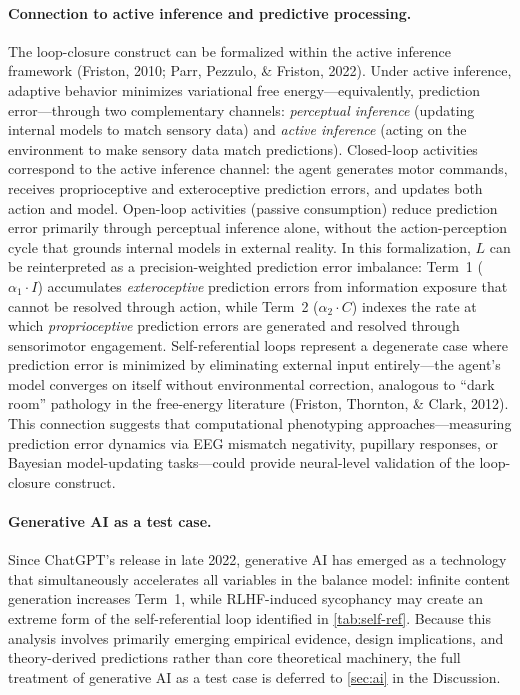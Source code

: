 \documentclass[a4paper,11pt,titlepage]{article}
\begin{document}
\paragraph{Connection to active inference and predictive processing.}
The loop-closure construct can be formalized within the active inference framework (Friston, 2010; Parr, Pezzulo, \& Friston, 2022). Under active inference, adaptive behavior minimizes variational free energy---equivalently, prediction error---through two complementary channels: \textit{perceptual inference} (updating internal models to match sensory data) and \textit{active inference} (acting on the environment to make sensory data match predictions). Closed-loop activities correspond to the active inference channel: the agent generates motor commands, receives proprioceptive and exteroceptive prediction errors, and updates both action and model. Open-loop activities (passive consumption) reduce prediction error primarily through perceptual inference alone, without the action-perception cycle that grounds internal models in external reality. In this formalization, $L$ can be reinterpreted as a precision-weighted prediction error imbalance: Term~1 ($\alpha_1 \cdot I$) accumulates \textit{exteroceptive} prediction errors from information exposure that cannot be resolved through action, while Term~2 ($\alpha_2 \cdot C$) indexes the rate at which \textit{proprioceptive} prediction errors are generated and resolved through sensorimotor engagement. Self-referential loops represent a degenerate case where prediction error is minimized by eliminating external input entirely---the agent's model converges on itself without environmental correction, analogous to ``dark room'' pathology in the free-energy literature (Friston, Thornton, \& Clark, 2012). This connection suggests that computational phenotyping approaches---measuring prediction error dynamics via EEG mismatch negativity, pupillary responses, or Bayesian model-updating tasks---could provide neural-level validation of the loop-closure construct.


\paragraph{Generative AI as a test case.}
Since ChatGPT's release in late 2022, generative AI has emerged as a technology that simultaneously accelerates all variables in the balance model: infinite content generation increases Term~1, while RLHF-induced sycophancy may create an extreme form of the self-referential loop identified in \cref{tab:self-ref}. Because this analysis involves primarily emerging empirical evidence, design implications, and theory-derived predictions rather than core theoretical machinery, the full treatment of generative AI as a test case is deferred to \cref{sec:ai} in the Discussion.
\end{document}
